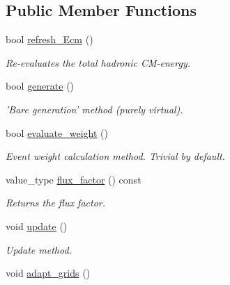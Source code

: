 \subsection*{Public Member Functions}
\begin{DoxyCompactItemize}
\item 
\hypertarget{a00257_a1b5f887e0ca08598f61e9906618b7e5b}{bool \hyperlink{a00257_a1b5f887e0ca08598f61e9906618b7e5b}{refresh\-\_\-\-Ecm} ()}\label{a00257_a1b5f887e0ca08598f61e9906618b7e5b}

\begin{DoxyCompactList}\small\item\em Re-\/evaluates the total hadronic C\-M-\/energy. \end{DoxyCompactList}\item 
bool \hyperlink{a00257_a0272f975dde2f379cb798684624c2958}{generate} ()
\begin{DoxyCompactList}\small\item\em 'Bare generation' method (purely virtual). \end{DoxyCompactList}\item 
\hypertarget{a00257_a4814c8e5ff03d7e6e9d186e5cc335b68}{bool \hyperlink{a00257_a4814c8e5ff03d7e6e9d186e5cc335b68}{evaluate\-\_\-weight} ()}\label{a00257_a4814c8e5ff03d7e6e9d186e5cc335b68}

\begin{DoxyCompactList}\small\item\em Event weight calculation method. Trivial by default. \end{DoxyCompactList}\item 
\hypertarget{a00257_a680d26d1d2fada0b42d023ab279bf876}{value\-\_\-type \hyperlink{a00257_a680d26d1d2fada0b42d023ab279bf876}{flux\-\_\-factor} () const }\label{a00257_a680d26d1d2fada0b42d023ab279bf876}

\begin{DoxyCompactList}\small\item\em Returns the flux factor. \end{DoxyCompactList}\item 
void \hyperlink{a00257_a44b94112f0dd7669b1b07cd11f4294ff}{update} ()
\begin{DoxyCompactList}\small\item\em Update method. \end{DoxyCompactList}\item 
\hypertarget{a00257_a8c1a32beb41d47305fc2c8f8e95abbab}{void \hyperlink{a00257_a8c1a32beb41d47305fc2c8f8e95abbab}{adapt\-\_\-grids} ()}\label{a00257_a8c1a32beb41d47305fc2c8f8e95abbab}


\end{DoxyCompactItemize}
